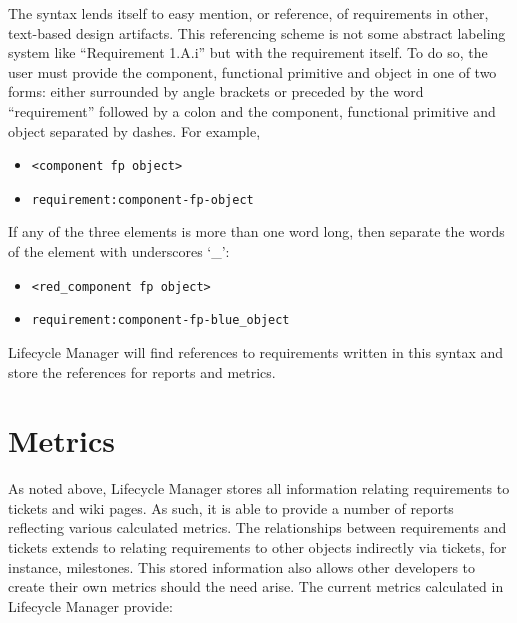 \documentclass[letterpaper,10pt]{article}
\begin{document}
                The syntax lends itself to easy mention, or reference,
                of requirements in other, text-based design
                artifacts. This referencing scheme is not some
                abstract labeling system like ``Requirement 1.A.i''
                but with the requirement itself. To do so, the user
                must provide the component, functional primitive and
                object in one of two forms: either surrounded by angle
                brackets or preceded by the word ``requirement''
                followed by a colon and the component, functional
                primitive and object separated by dashes.  For
                example,

            \begin{itemize}
                \item \begin{verbatim}<component fp object>\end{verbatim}
                \item \begin{verbatim}requirement:component-fp-object\end{verbatim}
            \end{itemize}

            If any of the three elements is more than one word long,
            then separate the words of the element with underscores
            `\_':

            \begin{itemize}
                \item \begin{verbatim}<red_component fp object>\end{verbatim}
                \item \begin{verbatim}requirement:component-fp-blue_object\end{verbatim}
            \end{itemize}

            Lifecycle Manager will find references to requirements
            written in this syntax and store the references for
            reports and metrics.

    \section{Metrics}
    \label{sec:metrics}

    As noted above, Lifecycle Manager stores all information relating 
    requirements to tickets and wiki pages.  As such, it is able to provide a 
    number of reports reflecting various calculated metrics.  The 
    relationships between requirements and tickets extends to relating 
    requirements to other objects indirectly via tickets, for instance, 
    milestones.  This stored information also allows other developers to 
    create their own metrics should the need arise.  The current metrics 
    calculated in Lifecycle Manager provide:
\end{document}
